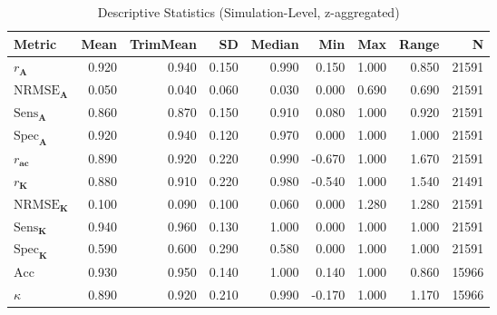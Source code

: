 \begin{table}[ht]
\centering
\begin{tabular}{lrrrrrrrr}
  \hline
Metric & Mean & TrimMean & SD & Median & Min & Max & Range & N \\ 
  \hline
$r_{\boldsymbol{A}}$ & 0.920 & 0.940 & 0.150 & 0.990 & 0.150 & 1.000 & 0.850 & 21591 \\ 
  $\text{NRMSE}_{\boldsymbol{A}}$ & 0.050 & 0.040 & 0.060 & 0.030 & 0.000 & 0.690 & 0.690 & 21591 \\ 
  $\text{Sens}_{\boldsymbol{A}}$ & 0.860 & 0.870 & 0.150 & 0.910 & 0.080 & 1.000 & 0.920 & 21591 \\ 
  $\text{Spec}_{\boldsymbol{A}}$ & 0.920 & 0.940 & 0.120 & 0.970 & 0.000 & 1.000 & 1.000 & 21591 \\ 
  $r_{\boldsymbol{ac}}$ & 0.890 & 0.920 & 0.220 & 0.990 & -0.670 & 1.000 & 1.670 & 21591 \\ 
  $r_{\boldsymbol{K}}$ & 0.880 & 0.910 & 0.220 & 0.980 & -0.540 & 1.000 & 1.540 & 21491 \\ 
  $\text{NRMSE}_{\boldsymbol{K}}$ & 0.100 & 0.090 & 0.100 & 0.060 & 0.000 & 1.280 & 1.280 & 21591 \\ 
  $\text{Sens}_{\boldsymbol{K}}$ & 0.940 & 0.960 & 0.130 & 1.000 & 0.000 & 1.000 & 1.000 & 21591 \\ 
  $\text{Spec}_{\boldsymbol{K}}$ & 0.590 & 0.600 & 0.290 & 0.580 & 0.000 & 1.000 & 1.000 & 21591 \\ 
  $\text{Acc}$ & 0.930 & 0.950 & 0.140 & 1.000 & 0.140 & 1.000 & 0.860 & 15966 \\ 
  $\kappa$ & 0.890 & 0.920 & 0.210 & 0.990 & -0.170 & 1.000 & 1.170 & 15966 \\ 
   \hline
\end{tabular}
\caption{Descriptive Statistics (Simulation-Level, z-aggregated)} 
\end{table}
